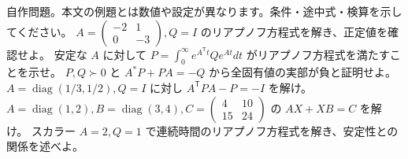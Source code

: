 \documentclass[11pt]{article}
\begin{document}
自作問題。本文の例題とは数値や設定が異なります。条件・途中式・検算を示してください。
\problem[連続時間の成分計算]
$A=\begin{pmatrix}-2&1\\0&-3\end{pmatrix},Q=I$ のリアプノフ方程式を解き、正定値を確認せよ。
\workspace{45mm}
\problem[積分表示]
安定な $A$ に対して $P=\int_0^\infty e^{A^{\mathsf T}t}Qe^{At}dt$ がリアプノフ方程式を満たすことを示せ。
\workspace{45mm}
\newpage
\problem[逆向きの安定性]
$P,Q\succ0$ と $A^*P+PA=-Q$ から全固有値の実部が負と証明せよ。
\workspace{45mm}
\problem[離散時間]
$A=\operatorname{diag}(1/3,1/2),Q=I$ に対し $A^{\mathsf T}PA-P=-I$ を解け。
\workspace{45mm}
\newpage
\problem[Sylvester方程式]
$A=\operatorname{diag}(1,2),B=\operatorname{diag}(3,4),C=\begin{pmatrix}4&10\\15&24\end{pmatrix}$ の $AX+XB=C$ を解け。
\workspace{45mm}
\problem[解はあっても正定値でない]
スカラー $A=2,Q=1$ で連続時間のリアプノフ方程式を解き、安定性との関係を述べよ。
\workspace{45mm}
\end{document}
